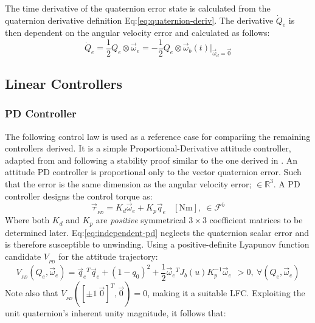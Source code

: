 The time derivative of the quaternion error state is calculated from the quaternion derivative definition Eq:\ref{eq:quaternion-deriv}. The derivative $\dot{Q}_e$ is then dependent on the angular velocity error and calculated as follows:
\begin{equation}
\dot{Q}_e=\frac{1}{2}Q_e\otimes\vec{\omega}_e=-\frac{1}{2}Q_e\otimes\vec{\omega}_b(t)\Big|_{\vec{\omega}_d=\vec{0}}
\end{equation}
\subsection{Linear Controllers}
\label{subsec:control.attitude.controllers}
\subsubsection{PD Controller}
\label{subsubsec:control.attitude.controllers.pd}
The following control law is used as a reference case for compariing the remaining controllers derived. It is a simple Proportional-Derivative attitude controller, adapted from \cite{fullquaternion} and following a stability proof similar to the one derived in \cite{attitudecontrolproblem}. An attitude PD controller is proportional only to the vector quaternion error. Such that the error is the same dimension as the angular velocity error; $\in\mathbb{R}^3$. A PD controller designs the control torque as:
\begin{equation}\label{eq:independent-pd}
\vec{\tau}_{_{PD}}=K_d\vec{\omega}_e+K_p\vec{q}_e~~~~[\text{Nm}],~\in\mathcal{F}^b
\end{equation}
Where both $K_d$ and $K_p$ are \emph{positive} symmetrical $3\times 3$ coefficient matrices to be determined later. Eq:\ref{eq:independent-pd} neglects the quaternion scalar error and is therefore susceptible to unwinding. Using a positive-definite Lyapunov function candidate $V_{_{PD}}$ for the attitude trajectory:
\begin{equation}\label{eq:lyapunov-pd}
V_{_{PD}}(Q_e,\vec{\omega}_e)=\vec{q}_e\text{}^T\vec{q}_e+(1-q_0)^2+\frac{1}{2}\vec{\omega}_e\text{}^TJ_b(u)K_p^{-1}\vec{\omega}_e~~>0,~\forall(Q_e,\vec{\omega}_e)
\end{equation}
Note also that $V_{_{PD}}([\pm 1~\vec{0}]^T,\vec{0})=0$, making it a suitable LFC. Exploiting the unit quaternion's inherent unity magnitude, it follows that:

